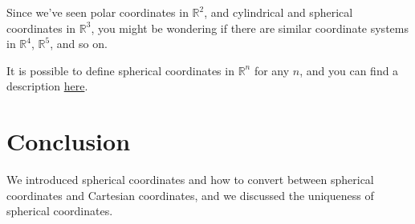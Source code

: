 \documentclass{ximera}
\begin{document}
Since we've seen polar coordinates in $\mathbb{R}^2$, and cylindrical and spherical coordinates in $\mathbb{R}^3$, you might be wondering if there are similar coordinate systems in $\mathbb{R}^4$, $\mathbb{R}^5$, and so on.

It is possible to define spherical coordinates in $\mathbb{R}^n$ for any $n$, and you can find a description \href{https://en.wikipedia.org/wiki/N-sphere#Spherical_coordinates
}{here}. 

\section{Conclusion}

We introduced spherical coordinates and how to convert between spherical coordinates and Cartesian coordinates, and we discussed the uniqueness of spherical coordinates.
\end{document}

